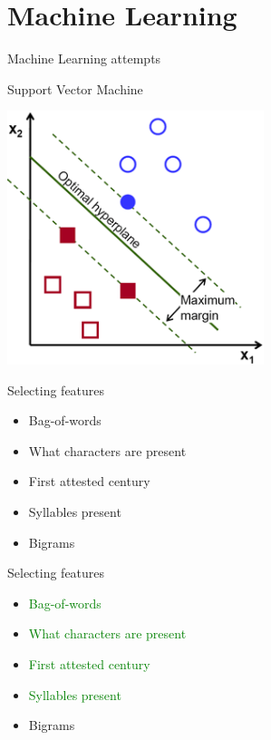 \documentclass[10pt]{beamer}
\begin{document}
\section{Machine Learning}

\begin{frame}[fragile]{Machine Learning attempts}

  Support Vector Machine

  \centerline{\includegraphics[width=7.5cm]{svmillustration.png}}

\end{frame}

\begin{frame}[fragile]{Selecting features}

  \begin{itemize}[<+->]
    \item Bag-of-words
    \item What characters are present
    \item First attested century
    \item Syllables present
    \item Bigrams
  \end{itemize}

\end{frame}

\begin{frame}[fragile]{Selecting features}

  \begin{itemize}
    \item \textcolor{green}{Bag-of-words}
    \item \textcolor{green}{What characters are present}
    \item \textcolor{green}{First attested century}
    \item \textcolor{green}{Syllables present}
    \item Bigrams
  \end{itemize}

\end{frame}
\end{document}
